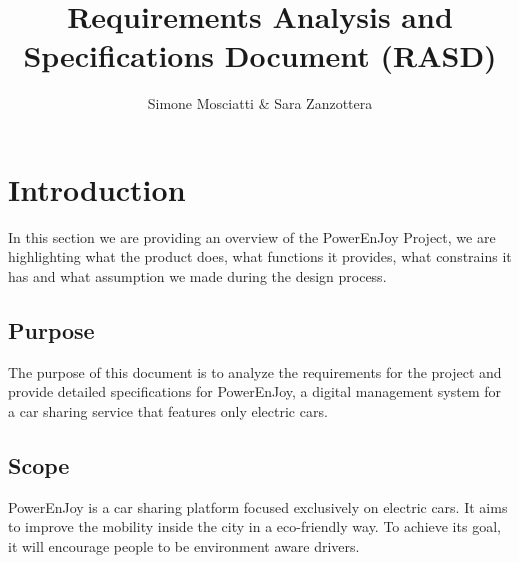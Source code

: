 \documentclass[11pt]{article} %
\title{Requirements Analysis and Specifications Document (RASD)}
\author{Simone Mosciatti \& Sara Zanzottera}
\newcommand{\pe}{PowerEnJoy }
\newcommand{\pecomma}{PowerEnJoy, }
\begin{document}
\maketitle
\newpage
\tableofcontents
\newpage


\section{Introduction}

In this section we are providing an overview of the \pe Project, we are highlighting what the product does, what functions it provides, what constrains it has and what assumption we made during the design process.

  \subsection{Purpose}
  
The purpose of this document is to analyze the requirements for the project and provide detailed specifications for \pecomma a digital management system for a car sharing service that features only electric cars.
  
  \subsection{Scope}
  
\pe is a car sharing platform focused exclusively on electric cars. It aims to improve the mobility inside the city in a eco-friendly way. To achieve its goal, it will encourage people to be environment aware drivers.
\end{document}
